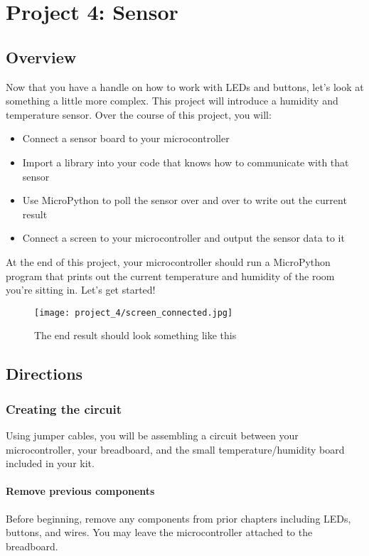 \chapter{Project 4: Sensor}

\section{Overview}
Now that you have a handle on how to work with LEDs and buttons, let's look at something a little more complex.
This project will introduce a humidity and temperature sensor. Over the course of this project, you will:
\begin{itemize}
    \item Connect a sensor board to your microcontroller
    \item Import a library into your code that knows how to communicate with that sensor
    \item Use MicroPython to poll the sensor over and over to write out the current result
    \item Connect a screen to your microcontroller and output the sensor data to it
\end{itemize}
At the end of this project, your microcontroller should run a MicroPython program that prints out the current
temperature and humidity of the room you're sitting in. Let's get started!
\begin{figure}[H]
\centering
    \texttt{[image: project\_4/screen\_connected.jpg]}
    \caption{The end result should look something like this}
\end{figure}

\pagebreak

\section{Directions}

\subsection{Creating the circuit}
Using jumper cables, you will be assembling a circuit between your microcontroller, your breadboard, and the small
temperature/humidity board included in your kit.

\subsubsection{Remove previous components}
Before beginning, remove any components from prior chapters including LEDs, buttons, and wires. You may leave the
microcontroller attached to the breadboard.

